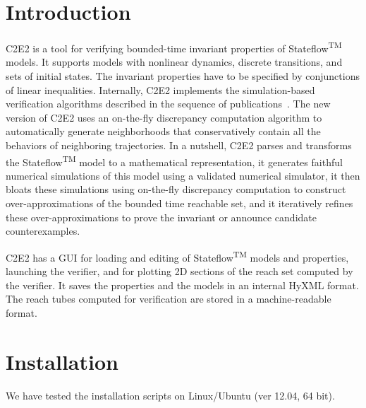 \documentclass{tufte-book} %
\begin{document}
\chapter{Introduction}
\label{sec:intro}
C2E2 is a tool for verifying bounded-time invariant properties of Stateflow\textsuperscript{TM}  models. It supports models with nonlinear dynamics, discrete transitions, and sets of initial states. The invariant properties have to be specified by conjunctions of linear inequalities. Internally, C2E2 implements the simulation-based verification algorithms described in the sequence of publications~\citet{ChuchuATVA,DMV13,DuggiralaWMVM14,SM:HSCC2011}. The new version of C2E2 uses an on-the-fly discrepancy computation algorithm \citet{ChuchuATVA} to automatically generate neighborhoods that conservatively contain all the behaviors of neighboring trajectories. In a nutshell, C2E2 parses and transforms the Stateflow\textsuperscript{TM} model to a mathematical representation, it generates faithful numerical simulations of this model using a validated numerical simulator, it then bloats these simulations using on-the-fly discrepancy computation to construct over-approximations of the bounded time reachable set, and it iteratively refines these over-approximations to prove the invariant or announce candidate counterexamples.

C2E2 has a GUI for loading and editing of Stateflow\textsuperscript{TM} models and properties, launching the verifier, and for plotting 2D sections of the reach set computed by the verifier. It saves the properties and the models in an internal HyXML format. The reach tubes computed for verification are stored in a machine-readable format.

\chapter{Installation}

We have tested the installation scripts on Linux/Ubuntu (ver 12.04, 64 bit).
\end{document}
